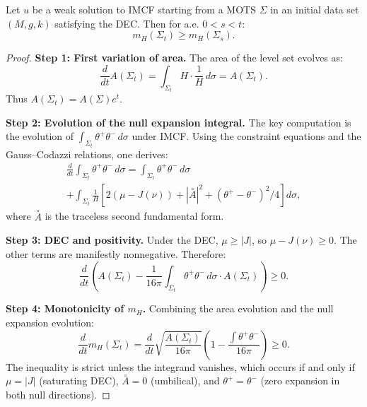 \begin{theorem}\label{thm:HawkingMonotone}
Let $u$ be a weak solution to IMCF starting from a MOTS $\Sigma$ in an initial data set $(M, g, k)$ satisfying the DEC. Then for a.e. $0 < s < t$:
\begin{equation}
    m_H(\Sigma_t) \ge m_H(\Sigma_s).
\end{equation}
\end{theorem}

\begin{proof}
\textbf{Step 1: First variation of area.}
The area of the level set evolves as:
\begin{equation}
    \frac{d}{dt} A(\Sigma_t) = \int_{\Sigma_t} H \cdot \frac{1}{H} \, d\sigma = A(\Sigma_t).
\end{equation}
Thus $A(\Sigma_t) = A(\Sigma) e^t$.

\textbf{Step 2: Evolution of the null expansion integral.}
The key computation is the evolution of $\int_{\Sigma_t} \theta^+ \theta^- \, d\sigma$ under IMCF. Using the constraint equations and the Gauss--Codazzi relations, one derives:
\begin{multline}
    \frac{d}{dt} \int_{\Sigma_t} \theta^+ \theta^- \, d\sigma = \int_{\Sigma_t} \theta^+ \theta^- \, d\sigma \\
    + \int_{\Sigma_t} \frac{1}{H} \left[ 2(\mu - J(\nu)) + |\overset{\circ}{A}|^2 + (\theta^+ - \theta^-)^2 / 4 \right] d\sigma,
\end{multline}
where $\overset{\circ}{A}$ is the traceless second fundamental form.

\textbf{Step 3: DEC and positivity.}
Under the DEC, $\mu \ge |J|$, so $\mu - J(\nu) \ge 0$. The other terms are manifestly nonnegative. Therefore:
\begin{equation}
    \frac{d}{dt} \left( A(\Sigma_t) - \frac{1}{16\pi} \int_{\Sigma_t} \theta^+ \theta^- \, d\sigma \cdot A(\Sigma_t) \right) \ge 0.
\end{equation}

\textbf{Step 4: Monotonicity of $m_H$.}
Combining the area evolution and the null expansion evolution:
\begin{equation}
    \frac{d}{dt} m_H(\Sigma_t) = \frac{d}{dt} \sqrt{\frac{A(\Sigma_t)}{16\pi}} \left( 1 - \frac{\int \theta^+ \theta^-}{16\pi} \right) \ge 0.
\end{equation}
The inequality is strict unless the integrand vanishes, which occurs if and only if $\mu = |J|$ (saturating DEC), $\overset{\circ}{A} = 0$ (umbilical), and $\theta^+ = \theta^-$ (zero expansion in both null directions).
\end{proof}

